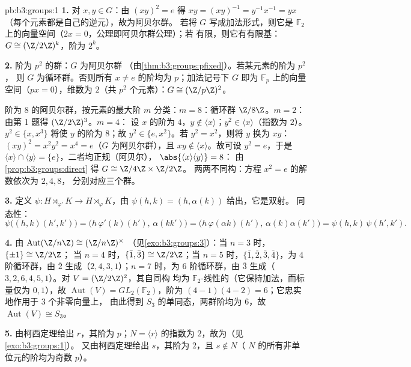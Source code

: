 \begin{solution}{pb:b3:groups:1}
\textbf{1.} 对 $x, y \in G$：由 $(xy)^2 = e$ 得 $xy = (xy)^{-1} =
y^{-1}x^{-1} = yx$（每个元素都是自己的逆元），故为阿贝尔群。
若将 $G$ 写成加法形式，则它是 $\mathbb
F_2$ 上的向量空间（$2x = 0$，公理即阿贝尔群公理）；若
有限，则它有有限基：$G \cong (\Z/2\Z)^k$，阶为
$2^k$。

\textbf{2.} 阶为 $p^2$ 的群：$G$ 为阿贝尔群
（由\cref{thm:b3:groups:pfixed}）。若某元素的阶为 $p^2$，
则 $G$ 为循环群。否则所有 $x \neq e$ 的阶均为 $p$；加法记号下
$G$ 即为 $\mathbb F_p$ 上的向量空间（$px = 0$），维数为
$2$（共 $p^2$ 个元素）：$G \cong (\Z/p\Z)^2$。

阶为 $8$ 的阿贝尔群，按元素的最大阶 $m$ 分类：$m =
8$：循环群 $\Z/8\Z$。$m = 2$：由第 1 题得 $(\Z/2\Z)^3$。$m = 4$：
设 $x$ 的阶为 $4$，$y \notin \langle x \rangle$；$y^2 \in
\langle x\rangle$（指数为 $2$）。$y^2 \in \{x, x^3\}$ 将使 $y$
的阶为 $8$；故 $y^2 \in \{e, x^2\}$。若 $y^2 = x^2$，则将 $y$ 换为
$xy$：$(xy)^2 = x^2y^2 = x^4 = e$（$G$ 为阿贝尔群），且 $xy \notin
\langle x\rangle$。故可设 $y^2 = e$，于是 $\langle x
\rangle \cap \langle y \rangle = \{e\}$，二者均正规（阿贝尔），
$\abs{\langle x\rangle \langle y\rangle} = 8$：
由\cref{prop:b3:groups:direct} 得 $G \cong \Z/4\Z \times \Z/2\Z$。
两两不同构：方程 $x^2 = e$ 的解数依次为 $2, 4, 8$，
分别对应三个群。

\textbf{3.} 定义 $\psi \colon H \rtimes_{\varphi'} K \to H
\rtimes_{\varphi} K$，由 $\psi(h, k) = (h, \alpha(k))$ 给出，它是双射。
同态性：
\[
\psi\bigl((h,k)(h',k')\bigr)
= \bigl(h\,\varphi'(k)(h'),\, \alpha(kk')\bigr)
= \bigl(h\,\varphi(\alpha k)(h'),\, \alpha(k)\alpha(k')\bigr)
= \psi(h,k)\,\psi(h',k').
\]

\textbf{4.} 由 $\operatorname{Aut}(\Z/n\Z) \cong (\Z/n\Z)^\times$
（见\cref{exo:b3:groups:3}）：当 $n = 3$ 时，$\{\pm 1\} \cong \Z/2\Z$；
当 $n = 4$ 时，$\{\bar 1, \bar 3\} \cong \Z/2\Z$；当 $n = 5$ 时，$\{\bar 1,
\bar 2, \bar 3, \bar 4\}$，为 $4$ 阶循环群，由 $\bar
2$ 生成（$2, 4, 3, 1$）；$n = 7$ 时，为 $6$ 阶循环群，由 $\bar
3$ 生成（$3, 2, 6, 4, 5, 1$）。对 $V = (\Z/2\Z)^2$，其自同构
均为 $\mathbb F_2$-线性的（它保持加法，而标量仅为 $0,
1$），故 $\operatorname{Aut}(V) = GL_2(\mathbb F_2)$，阶为
$(4-1)(4-2) = 6$；它忠实地作用于 $3$ 个非零向量上，
由此得到 $S_3$ 的单同态，两群阶均为
$6$，故 $\operatorname{Aut}(V) \cong S_3$。

\textbf{5.} 由柯西定理给出 $r$，其阶为 $p$；$N = \langle r
\rangle$ 的指数为 $2$，故为（见\cref{exo:b3:groups:1}）。
又由柯西定理给出 $s$，其阶为 $2$，且 $s \notin N$（
$N$ 的所有非单位元的阶均为奇数 $p$）。


\end{solution}
